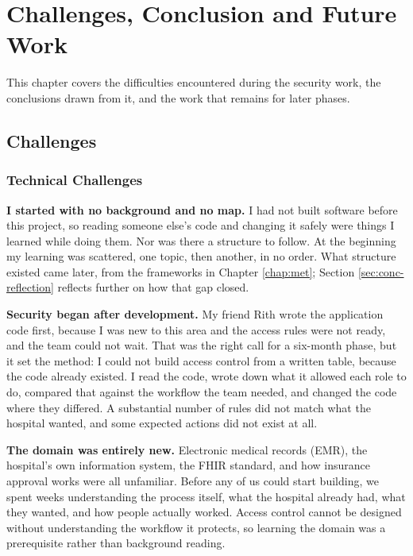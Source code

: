 \chapter{Challenges, Conclusion and Future Work}
\label{chap:conclusion}

This chapter covers the difficulties encountered during the security work, the conclusions drawn from it, and the work that remains for later phases.

\section{Challenges}
\label{sec:conc-challenges}

\subsection{Technical Challenges}
\label{sec:conc-technical}

\textbf{I started with no background and no map.} I had not built software before this project, so reading someone else's code and changing it safely were things I learned while doing them. Nor was there a structure to follow. At the beginning my learning was scattered, one topic, then another, in no order. What structure existed came later, from the frameworks in Chapter \ref{chap:met}; Section \ref{sec:conc-reflection} reflects further on how that gap closed.

\textbf{Security began after development.} My friend Rith wrote the application code first, because I was new to this area and the access rules were not ready, and the team could not wait. That was the right call for a six-month phase, but it set the method: I could not build access control from a written table, because the code already existed. I read the code, wrote down what it allowed each role to do, compared that against the workflow the team needed, and changed the code where they differed. A substantial number of rules did not match what the hospital wanted, and some expected actions did not exist at all.

\textbf{The domain was entirely new.} Electronic medical records (EMR), the hospital's own information system, the FHIR standard, and how insurance approval works were all unfamiliar. Before any of us could start building, we spent weeks understanding the process itself, what the hospital already had, what they wanted, and how people actually worked. Access control cannot be designed without understanding the workflow it protects, so learning the domain was a prerequisite rather than background reading.

